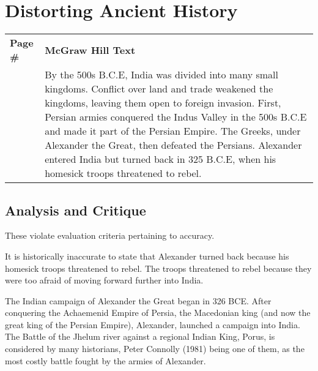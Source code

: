 \chapter{Distorting Ancient History}

\begin{longtable}{|>{\raggedleft}p{1.5cm}|p{8.5cm}|}
\multicolumn{2}{c}{\textbf{Table: 1}}\\ 
\hline
\textbf{Page \#} & \textbf{McGraw Hill Text} \tabularnewline
\hline 
270 & By the 500s B.C.E, India was divided into many small kingdoms. Conflict over land and trade weakened the kingdoms, leaving them open to foreign invasion. First, Persian armies conquered the Indus Valley in the 500s B.C.E and made it part of the Persian Empire. The Greeks, under Alexander the Great, then defeated the Persians. Alexander entered India but turned back in 325 B.C.E, when his homesick troops threatened to rebel. \tabularnewline
\hline
\end{longtable}

\section*{Analysis and Critique} 

These violate evaluation criteria pertaining to accuracy.

It is historically inaccurate to state that Alexander turned back because his homesick troops threatened to rebel. The troops threatened to rebel because they were too afraid of moving forward further into India.

The Indian campaign of Alexander the Great began in 326 BCE. After conquering the Achaemenid Empire of Persia, the Macedonian king (and now the great king of the Persian Empire), Alexander, launched a campaign into India. The Battle of the Jhelum river against a regional Indian King, Porus, is considered by many historians, Peter Connolly (1981) being one of them, as the most costly battle fought by the armies of Alexander.

